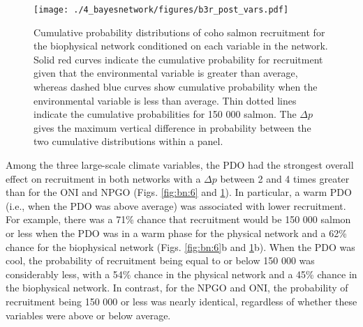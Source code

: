 \begin{figure}[htbp]
  \centering \texttt{[image: ./4\_bayesnetwork/figures/b3r\_post\_vars.pdf]}
  \caption[Cumulative probability distributions of coho salmon recruitment for
           the biophysical network conditioned on each variable in the
           network]{Cumulative probability distributions of coho salmon
           recruitment for the biophysical network conditioned on each variable
           in the network. Solid red curves indicate the cumulative probability
           for recruitment given that the environmental variable is greater than
           average, whereas dashed blue curves show cumulative probability when
           the environmental variable is less than average. Thin dotted lines
           indicate the cumulative probabilities for 150 000 salmon. The
           \(\Delta p\) gives the maximum vertical difference in probability
           between the two cumulative distributions within a panel.}
  \label{fig:bn:7}
\end{figure}

Among the three large-scale climate variables, the PDO had the strongest overall
effect on recruitment in both networks with a \(\Delta p\) between 2 and 4 times
greater than for the ONI and NPGO (Figs. \ref{fig:bn:6} and \ref{fig:bn:7}). In
particular, a warm PDO (i.e., when the PDO was above average) was associated
with lower recruitment. For example, there was a 71\% chance that recruitment
would be 150 000 salmon or less when the PDO was in a warm phase for the
physical network and a 62\% chance for the biophysical network (Figs.
\ref{fig:bn:6}b and \ref{fig:bn:7}b). When the PDO was cool, the probability of
recruitment being equal to or below 150 000 was considerably less, with a 54\%
chance in the physical network and a 45\% chance in the biophysical network. In
contrast, for the NPGO and ONI, the probability of recruitment being 150 000 or
less was nearly identical, regardless of whether these variables were above or
below average.

